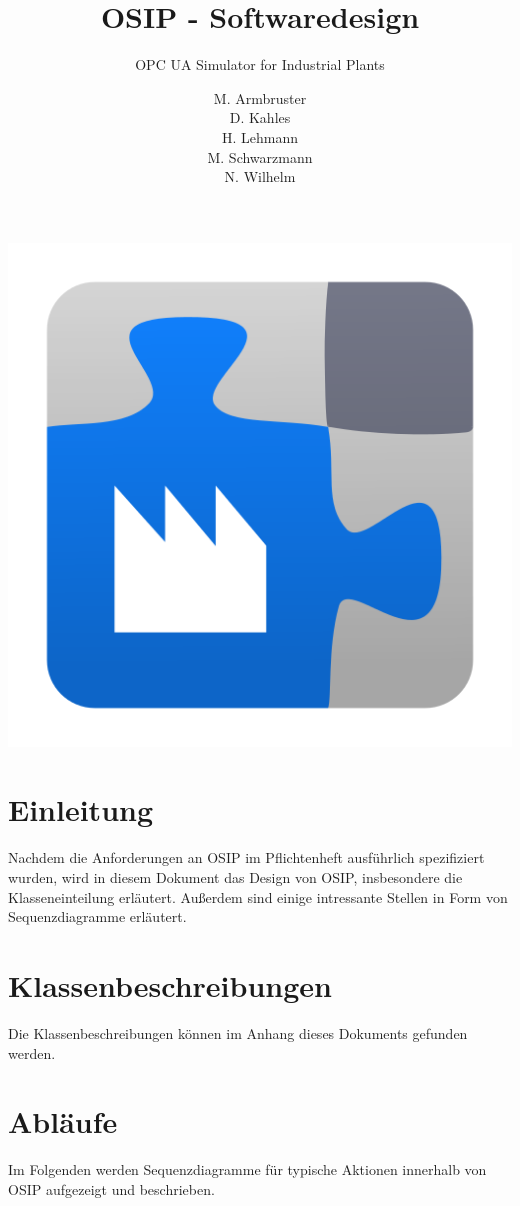 \documentclass[parskip=full]{scrartcl}
\title{OSIP - Softwaredesign}
\subtitle{OPC UA Simulator for Industrial Plants}
\author{
    M. Armbruster\\
    D. Kahles\\
    H. Lehmann\\
    M. Schwarzmann\\
    N. Wilhelm
}
\begin{document}
\maketitle

\vspace{20px}
\begin{center}
  \includegraphics[scale=0.4]{../icon.png}
\end{center}
\pagebreak
\tableofcontents
\pagebreak

\section{Einleitung}
Nachdem die Anforderungen an OSIP im Pflichtenheft ausführlich spezifiziert wurden, wird in diesem Dokument
das Design von OSIP, insbesondere die Klasseneinteilung erläutert. Außerdem sind einige intressante Stellen in
Form von Sequenzdiagramme erläutert.

\section{Klassenbeschreibungen}
Die Klassenbeschreibungen können im Anhang dieses Dokuments gefunden werden.

\section{Abläufe}
Im Folgenden werden Sequenzdiagramme für typische Aktionen innerhalb von OSIP aufgezeigt und beschrieben.
\end{document}
